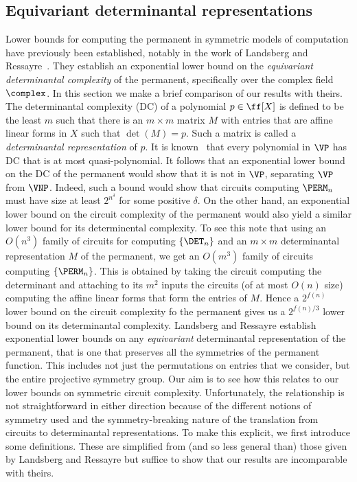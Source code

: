 \documentclass{toc}
\begin{document}
\subsection{Equivariant determinantal representations}\label{sec:equivariant}
Lower bounds for computing the permanent in symmetric models of computation have previously been established, notably in the work of Landsberg and Ressayre~\cite{LandsbergR16}.  They establish an exponential lower bound on the \emph{equivariant determinantal complexity} of the permanent, specifically over the complex field $\complex$.  In this section we make a brief comparison of our results with theirs.
The determinantal complexity (DC) of a polynomial $p \in \ff[X]$ is defined to be the least $m$ such that there is an $m\times m$ matrix $M$ with entries that are affine linear forms in $X$ such that $\det(M) = p$.  Such a matrix is called a \emph{determinantal representation} of $p$.  It is known~\cite{Valiant79} that every polynomial in $\VP$ has DC that is at most quasi-polynomial.  It follows that an exponential lower bound on the DC of the permanent would show that it is not in $\VP$, separating $\VP$ from $\VNP$.  Indeed, such a bound would 
show that circuits computing $\PERM_n$ must have size at least $2^{n^{\delta}}$ for some positive $\delta$.  On the other hand, an exponential lower bound on the circuit complexity of the permanent would also yield a similar lower bound for its determinental complexity.  To see this note that using an $O(n^3)$ family of circuits for computing $\{\DET_n\}$ and an $m\times m$ determinantal representation $M$ of the permanent, we get an $O(m^3)$ family of circuits computing $\{\PERM_n\}$.  This is obtained by taking the circuit computing the determinant and attaching to its $m^2$ inputs the circuits (of at most $O(n)$ size) computing the affine linear forms that form the entries of $M$.  Hence a $2^{f(n)}$ lower bound on the circuit complexity fo the permanent gives us a $2^{f(n)/3}$ lower bound on its determinantal complexity.
Landsberg and Ressayre establish exponential lower bounds on any \emph{equivariant} determinantal representation of the permanent, that is one that preserves all the symmetries of the permanent function.  This includes not just the
permutations on entries that we consider, but the entire projective symmetry
group.  Our aim is to see how this relates to our lower bounds on symmetric circuit complexity.  Unfortunately, the relationship is not straightforward in either direction because of the different notions of symmetry used and the symmetry-breaking nature of the translation from circuits to determinantal representations.  To make this explicit, we first introduce some definitions.  These are simplified from (and so less general than) those given by Landsberg and Ressayre but suffice to show that our results are incomparable with theirs. 
\end{document}
